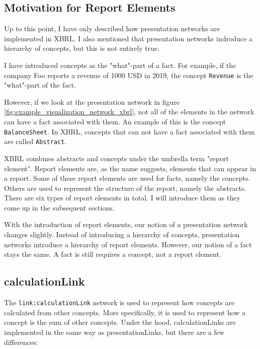 \subsection{Motivation for Report Elements}
\label{sec:report_elements_motivation}

Up to this point, I have only described how presentation networks are implemented in XBRL.
I also mentioned that presentation networks indroduce a hierarchy of concepts, but this is not entirely true.

I have introduced concepts as the "what"-part of a fact. 
For example, if the company Foo reports a revenue of 1000 USD in 2019, the concept \texttt{Revenue} is the "what"-part of the fact.

However, if we look at the presentation network in figure \ref{fig:example_visualization_network_xbrl}, not all of the elements in the network can have a fact associated with them.
An example of this is the concept \texttt{BalanceSheet}.
In XBRL, concepts that can not have a fact associated with them are called \texttt{Abstract}.

XBRL combines abstracts and concepts under the umbrella term "report element".
Report elements are, as the name suggests, elements that can appear in a report.
Some of these report elements are used for facts, namely the concepts.
Others are used to represent the structure of the report, namely the abstracts.
There are six types of report elements in total\cite{oim}. 
I will introduce them as they come up in the subsequent sections.

With the introduction of report elements, our notion of a presentation network changes slightly.
Instead of introducing a hierarchy of concepts, presentation networks introduce a hierarchy of report elements.
However, our notion of a fact stays the same.
A fact is still requires a concept, not a report element.

\subsection{calculationLink}

The \texttt{link:calculationLink} network is used to represent how concepts are calculated from other concepts.
More specifically, it is used to represent how a concept is the sum of other concepts.
Under the hood, calculationLinks are implemented in the same way as presentationLinks, but there are a few differences:

